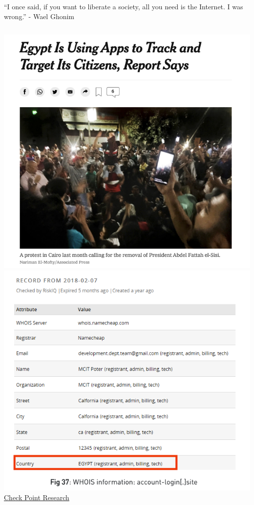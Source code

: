 \documentclass[nobackground,dvipsnames,table]{beamer}
\begin{document}
\begin{frame}{“I once said, if you want to liberate a society, all you need is the Internet. I was wrong.” - Wael Ghonim}
    \begin{columns}
            \includegraphics[width=\textwidth]{egypt-tracking-citizens}
            \includegraphics[width=\textwidth]{egypt-tracking-evidence}
            \href{https://research.checkpoint.com/2019/the-eye-on-the-nile/}{Check Point Research}
    \end{columns}
\end{frame}
\end{document}
